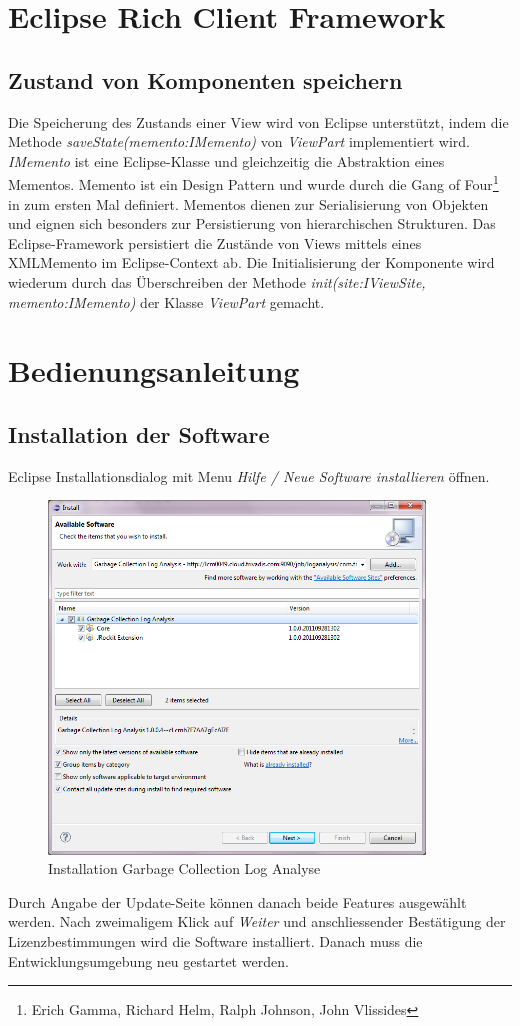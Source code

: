 \chapter{Eclipse Rich Client Framework}
\section*{Zustand von Komponenten speichern}\label{memento}
Die Speicherung des Zustands einer View wird von Eclipse unterstützt, indem die Methode \textit{saveState(memento:IMemento)} von \textit{ViewPart} implementiert wird. \textit{IMemento} ist eine Eclipse-Klasse und gleichzeitig die Abstraktion eines Mementos. Memento ist ein Design Pattern und wurde durch die Gang of Four\footnote{Erich Gamma, Richard Helm, Ralph Johnson, John Vlissides} in \cite[S. 283]{gamma1995design} zum ersten Mal definiert. Mementos dienen zur Serialisierung von Objekten und eignen sich besonders zur Persistierung von hierarchischen Strukturen. Das Eclipse-Framework persistiert die Zustände von Views mittels eines XMLMemento im Eclipse-Context ab. Die Initialisierung der Komponente wird wiederum durch das Überschreiben der Methode \textit{init(site:IViewSite, memento:IMemento)} der Klasse \textit{ViewPart} gemacht.

\chapter{Bedienungsanleitung}\label{bedienungsanleitung}
\section*{Installation der Software}
Eclipse Installationsdialog mit Menu \textit{Hilfe / Neue Software installieren} öffnen.
 \begin{figure}[H]
  	\centering
    	\includegraphics[width=10cm]{images/tutorial_install01}
        	\caption{Installation Garbage Collection Log Analyse}
\end{figure}
Durch Angabe der Update-Seite können danach beide Features ausgewählt werden. Nach zweimaligem Klick auf \textit{Weiter} und anschliessender Bestätigung der Lizenzbestimmungen wird die Software installiert. Danach muss die Entwicklungsumgebung neu gestartet werden.


